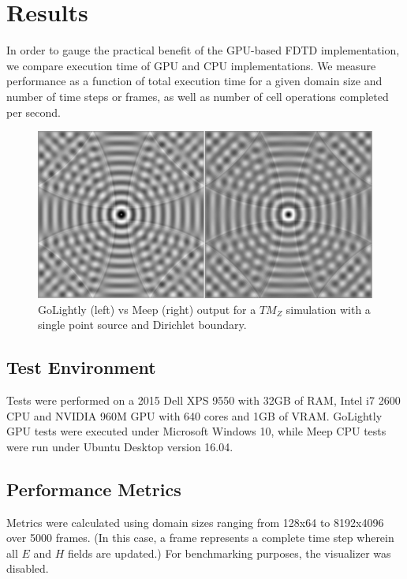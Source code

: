 \chapter{Results} \label{ch:conclusions}

In order to gauge the practical benefit of the GPU-based FDTD implementation, we compare execution time  of GPU and CPU implementations. We measure performance as a function of total execution time for a given domain size and number of time steps or frames, as well as number of cell operations completed per second. 

\begin{figure}[H]
	\centering
	\includegraphics[width=\textwidth,keepaspectratio]{point-source-comparison.jpg}
	\caption{GoLightly (left) vs Meep (right) output for a ${TM}_Z$ simulation with a single point source and Dirichlet boundary.}
	\label{fig:pointSourceComparison}
\end{figure}

\section{Test Environment}

Tests were performed on a 2015 Dell XPS 9550 with 32GB of RAM, Intel i7 2600 CPU and NVIDIA 960M GPU with 640 cores and 1GB of VRAM. GoLightly GPU tests were executed under Microsoft Windows 10, while Meep CPU tests were run under Ubuntu Desktop version 16.04.
 

\section{Performance Metrics}

Metrics were calculated using domain sizes ranging from 128x64 to 8192x4096 over 5000 frames. (In this case, a frame represents a complete time step wherein all $E$ and $H$ fields are updated.) For benchmarking purposes, the visualizer was disabled.


